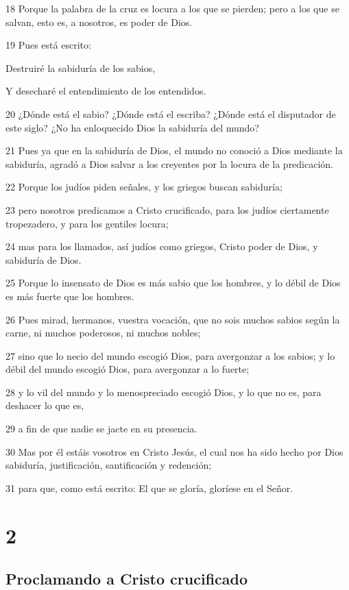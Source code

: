 \par 18 Porque la palabra de la cruz es locura a los que se pierden; pero a los que se salvan, esto es, a nosotros, es poder de Dios.
\par 19 Pues está escrito:
\par Destruiré la sabiduría de los sabios,
\par Y desecharé el entendimiento de los entendidos.
\par 20 ¿Dónde está el sabio? ¿Dónde está el escriba? ¿Dónde está el disputador de este siglo? ¿No ha enloquecido Dios la sabiduría del mundo?
\par 21 Pues ya que en la sabiduría de Dios, el mundo no conoció a Dios mediante la sabiduría, agradó a Dios salvar a los creyentes por la locura de la predicación.
\par 22 Porque los judíos piden señales, y los griegos buscan sabiduría;
\par 23 pero nosotros predicamos a Cristo crucificado, para los judíos ciertamente tropezadero, y para los gentiles locura;
\par 24 mas para los llamados, así judíos como griegos, Cristo poder de Dios, y sabiduría de Dios.
\par 25 Porque lo insensato de Dios es más sabio que los hombres, y lo débil de Dios es más fuerte que los hombres.
\par 26 Pues mirad, hermanos, vuestra vocación, que no sois muchos sabios según la carne, ni muchos poderosos, ni muchos nobles;
\par 27 sino que lo necio del mundo escogió Dios, para avergonzar a los sabios; y lo débil del mundo escogió Dios, para avergonzar a lo fuerte;
\par 28 y lo vil del mundo y lo menospreciado escogió Dios, y lo que no es, para deshacer lo que es,
\par 29 a fin de que nadie se jacte en su presencia.
\par 30 Mas por él estáis vosotros en Cristo Jesús, el cual nos ha sido hecho por Dios sabiduría, justificación, santificación y redención;
\par 31 para que, como está escrito: El que se gloría, gloríese en el Señor.

\chapter{2}

\section*{Proclamando a Cristo crucificado}

